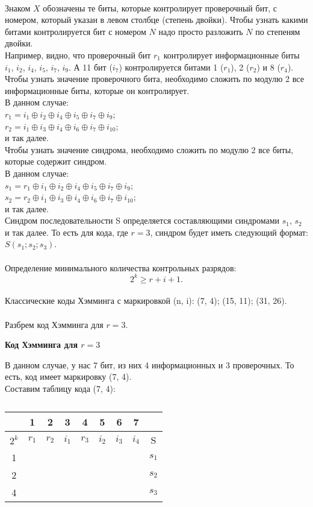 \\Знаком $X$ обозначены те биты, которые контролирует проверочный бит, с номером, который указан в левом столбце (степень двойки). Чтобы узнать какими битами контролируется бит с номером $N$ надо просто разложить $N$ по степеням двойки.
\\Например, видно, что проверочный бит $r_1$ контролирует информационные биты $i_1$, $i_2$, $i_4$, $i_5$, $i_7$, $i_9$. А 11 бит ($i_7$) контролируется битами 1 ($r_1$), 2 ($r_2$) и 8 ($r_4$).
\\Чтобы узнать значение проверочного бита, необходимо сложить по модулю 2 все информационные биты, которые он контролирует.
\\В данном случае:
\\$r_1 = i_1\oplus i_2\oplus i_4\oplus i_5\oplus i_7\oplus i_9$;
\\$r_2 = i_1\oplus i_3\oplus i_4\oplus i_6\oplus i_7\oplus i_10$;
\\и так далее.
\\Чтобы узнать значение синдрома, необходимо сложить по модулю 2 все биты, которые содержит синдром.
\\В данном случае:
\\$s_1 = r_1\oplus i_1\oplus i_2\oplus i_4\oplus i_5\oplus i_7\oplus i_9$;
\\$s_2 = r_2\oplus i_1\oplus i_3\oplus i_4\oplus i_6\oplus i_7\oplus i_{10}$;
\\и так далее.
\\Синдром последовательности S определяется составляющими синдромами $s_1$, $s_2$ и так далее. То есть для кода, где $r = 3$, синдром будет иметь следующий формат: $S(s_1;s_2;s_3)$.
\\
\\Определение минимального количества контрольных разрядов: $$2^k \ge r + i + 1.$$
\\Классические коды Хэмминга с маркировкой (n, i): (7, 4); (15, 11); (31, 26).
\\
\\Разбрем код Хэмминга для $r = 3$.
\begin{center}
\textbf{Код Хэмминга для $r = 3$}
\end{center}
В данном случае, у нас 7 бит, из них 4 информационных и 3 проверочных. То есть, код имеет маркировку (7, 4).
\\Составим таблицу кода (7, 4):
\begin{table}[h]
\caption{}
\begin{tabular}{|c|c|c|c|c|c|c|c|c|}
\hline
& 1 & 2 & 3 & 4 & 5 & 6 & 7 & \\
\hline
$2^k$ & $r_{1}$ & $r_{2}$ & $i_{1}$ & $r_{3}$ & $i_{2}$ & $i_{3}$ & $i_{4}$ & S\\
\hline
1 & \cellcolor{Gray1}{X} & & \cellcolor{Gray1}{X} & & \cellcolor{Gray1}{X} & & \cellcolor{Gray1}{X} & $s_{1}$\\
\hline
2 & & \cellcolor{Gray2}{X} & \cellcolor{Gray2}{X} & & & \cellcolor{Gray2}{X} & \cellcolor{Gray2}{X} & $s_{2}$ \\
\hline
4 & & & & \cellcolor{Gray3}{X} & \cellcolor{Gray3}{X} & \cellcolor{Gray3}{X} & \cellcolor{Gray3}{X} & $s_{3}$ \\
\hline
\end{tabular}
\end{table}
